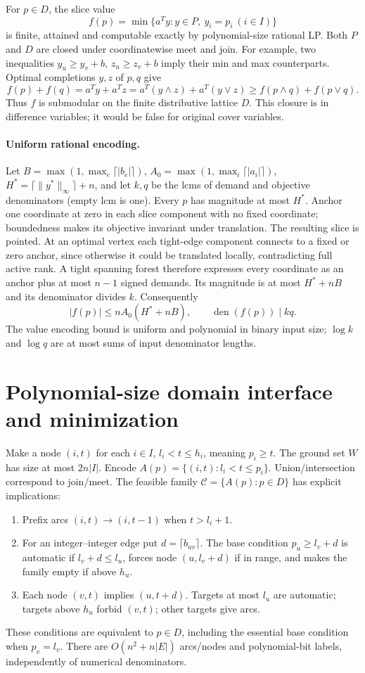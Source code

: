 \documentclass[11pt]{article}
\begin{document}
For $p\in D$, the slice value
\[
 f(p)=\min\{a^Ty:y\in P,\ y_i=p_i\ (i\in I)\}
\]
is finite, attained and computable exactly by polynomial-size rational LP.
Both $P$ and $D$ are closed under coordinatewise meet and join. For example,
two inequalities $y_u\ge y_v+b$, $z_u\ge z_v+b$ imply their min and max
counterparts. Optimal completions $y,z$ of $p,q$ give
\[
 f(p)+f(q)=a^Ty+a^Tz
 =a^T(y\wedge z)+a^T(y\vee z)
 \ge f(p\wedge q)+f(p\vee q).
\]
Thus $f$ is submodular on the finite distributive lattice $D$. This closure
is in difference variables; it would be false for original cover variables.

\paragraph{Uniform rational encoding.}
Let $B=\max(1,\max_e\lceil|b_e|\rceil)$,
$A_0=\max(1,\max_i\lceil|a_i|\rceil)$,
$H^*=\lceil\|y^*\|_\infty\rceil+n$, and let $k,q$ be the lcms of demand and
objective denominators (empty lcm is one). Every $p$ has magnitude at most
$H^*$. Anchor one coordinate at zero in each slice component with no fixed
coordinate; boundedness makes its objective invariant under translation.
The resulting slice is pointed. At an optimal vertex each tight-edge
component connects to a fixed or zero anchor, since otherwise it could be
translated locally, contradicting full active rank. A tight spanning forest
therefore expresses every coordinate as an anchor plus at most $n-1$ signed
demands. Its magnitude is at most $H^*+nB$ and its denominator divides $k$.
Consequently
\[
 |f(p)|\le nA_0(H^*+nB),\qquad \operatorname{den}(f(p))\mid kq.
\]
The value encoding bound is uniform and polynomial in binary input size;
$\log k$ and $\log q$ are at most sums of input denominator lengths.

\section{Polynomial-size domain interface and minimization}
Make a node $(i,t)$ for each $i\in I$, $l_i<t\le h_i$, meaning $p_i\ge t$.
The ground set $W$ has size at most $2n|I|$. Encode
$A(p)=\{(i,t):l_i<t\le p_i\}$. Union/intersection correspond to join/meet.
The feasible family $\mathcal C=\{A(p):p\in D\}$ has explicit implications:
\begin{enumerate}
\item Prefix arcs $(i,t)\to(i,t-1)$ when $t>l_i+1$.
\item For an integer--integer edge put $d=\lceil b_{uv}\rceil$. The base
condition $p_u\ge l_v+d$ is automatic if $l_v+d\le l_u$, forces node
$(u,l_v+d)$ if in range, and makes the family empty if above $h_u$.
\item Each node $(v,t)$ implies $(u,t+d)$. Targets at most $l_u$ are automatic;
targets above $h_u$ forbid $(v,t)$; other targets give arcs.
\end{enumerate}
These conditions are equivalent to $p\in D$, including the essential base
condition when $p_v=l_v$. There are $O(n^2+n|E|)$ arcs/nodes and polynomial-bit
labels, independently of numerical denominators.
\end{document}

